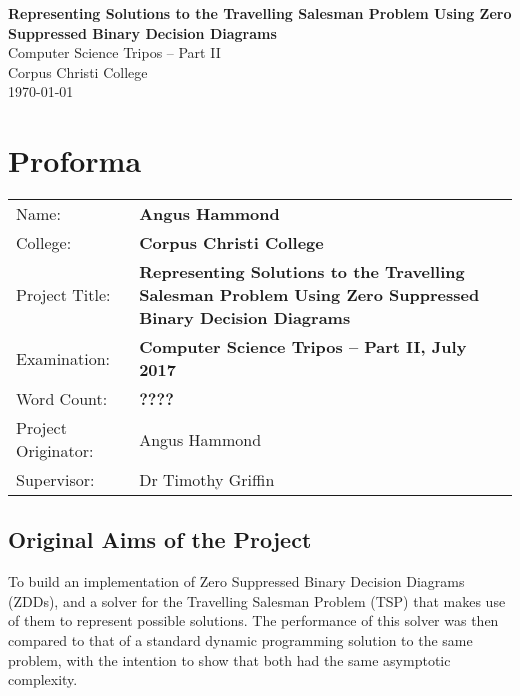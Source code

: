 \documentclass[12pt,a4paper,twoside,openright]{report}
\begin{document}





\pagestyle{empty}


\vspace*{60mm}
\begin{center}
\Huge
\textbf{Representing Solutions to the Travelling Salesman Problem Using Zero Suppressed Binary Decision Diagrams} \\[5mm]
Computer Science Tripos -- Part II \\[5mm]
Corpus Christi College \\[5mm]
\today  %
\end{center}


\pagestyle{plain}

\chapter*{Proforma}

{\large
\begin{tabular}{ll}
Name:               & \bf Angus Hammond                       \\
College:            & \bf Corpus Christi College                     \\
Project Title:      & \bf Representing Solutions to the Travelling Salesman Problem Using Zero Suppressed Binary Decision Diagrams \\
Examination:        & \bf Computer Science Tripos -- Part II, July 2017  \\
Word Count:         & \bf ????  \\
Project Originator: & Angus Hammond                    \\
Supervisor:         & Dr Timothy Griffin                    \\ 
\end{tabular}
}


\section*{Original Aims of the Project}

To build an implementation of Zero Suppressed Binary Decision Diagrams (ZDDs), and a solver for the Travelling Salesman Problem (TSP) that makes use of them to represent possible solutions. The performance of this solver was then compared to that of a standard dynamic programming solution to the same problem, with the intention to show that both had the same asymptotic complexity. 
\end{document}
